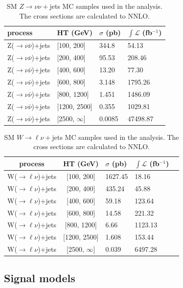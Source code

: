 \begin{table}
\centering
\caption{SM $Z\rightarrow\nu\nu+$jets MC samples used in the analysis. The cross sections are calculated to NNLO.}
\label{tab:zjetsMCsamples}
\begin{tabular}{llll}
\hline \hline
process & HT (GeV) & $\sigma$ (pb) & $\int\mathcal{L}$ (fb$^{-1}$)\\\hline
Z($\rightarrow\nu\bar{\nu}$)+jets & [100, 200] & 344.8 & 54.13\\
Z($\rightarrow\nu\bar{\nu}$)+jets & [200, 400] & 95.53 & 208.46\\
Z($\rightarrow\nu\bar{\nu}$)+jets & [400, 600] & 13.20 & 77.30\\
Z($\rightarrow\nu\bar{\nu}$)+jets & [600, 800] & 3.148 & 1795.26\\
Z($\rightarrow\nu\bar{\nu}$)+jets & [800, 1200] & 1.451 & 1486.09\\
Z($\rightarrow\nu\bar{\nu}$)+jets & [1200, 2500] & 0.355 & 1029.81\\
Z($\rightarrow\nu\bar{\nu}$)+jets & [2500, $\infty$] & 0.0085 & 47498.87\\
\hline \hline
\end{tabular}
\end{table}

\begin{table}
\centering
\caption{SM $W\rightarrow\ell\nu+$jets MC samples used in the analysis. The cross sections are calculated to NNLO.}
\label{tab:wjetsMCsamples}
\begin{tabular}{cclll}
\hline \hline
process & HT (GeV) & $\sigma$ (pb) & $\int\mathcal{L}$ (fb$^{-1}$)\\\hline
W($\rightarrow\ell\nu$)+jets & [100, 200] & 1627.45 & 18.16\\
W($\rightarrow\ell\nu$)+jets & [200, 400] & 435.24 & 45.88\\
W($\rightarrow\ell\nu$)+jets & [400, 600] & 59.18 & 123.64\\
W($\rightarrow\ell\nu$)+jets & [600, 800] & 14.58 & 221.32\\
W($\rightarrow\ell\nu$)+jets & [800, 1200] & 6.66 & 1123.13\\
W($\rightarrow\ell\nu$)+jets & [1200, 2500] & 1.608 & 153.44\\
W($\rightarrow\ell\nu$)+jets & [2500, $\infty$] & 0.039 & 6497.28\\
\hline \hline
\end{tabular}
\end{table}

\subsection{Signal models}
\label{sec:signal-models}

